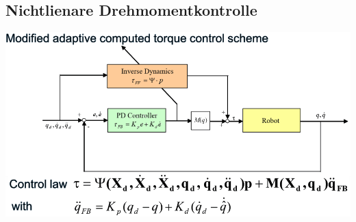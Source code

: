 \begin{minipage}{0.5\linewidth}
    \subsection{Nichtlienare Drehmomentkontrolle}
    \includegraphics[width=\linewidth]{./bilder/RegModNL}
\end{minipage}

